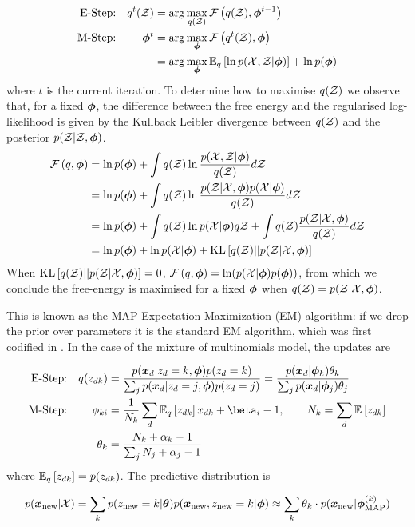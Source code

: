 \begin{align*}
\text{E-Step:} & & q^t(\zdat) & = \arg \max_{q(\zdat)} \fqt{q(\zdat), \param^{t-1}} \\
\text{M-Step:} & & \param^t & = \arg \max_{\param} \fqt{q^t(\zdat), \param} \\
& & & = \arg \max_{\param} \exlogjoint{q} + \ln p(\param)
\end{align*}
where $t$ is the current iteration. To determine how to maximise $q(\zdat)$ we observe that, for a fixed $\param$, the difference between the free energy and the regularised log-likelihood is given by the Kullback Leibler divergence between $q(\zdat)$ and the posterior $p(\zdat|\zdat, \param)$.
\begin{align*}
\fqt{q, \param} 
& = \ln p(\param) + \int q(\zdat) \ln \frac{p(\xdat, \zdat|\param)}{q(\zdat)} d\zdat \\
& = \ln p(\param) + \int q(\zdat) \ln \frac{p(\zdat|\xdat, \param)p(\xdat | \param)}{q(\zdat)} d\zdat \\
& = \ln p(\param) + \int q(\zdat) \ln p(\xdat | \param) q\zdat + \int q(\zdat)\frac{p(\zdat|\xdat, \param)}{q(\zdat)} d\zdat \\
& = \ln p(\param) + \ln p(\xdat | \param) + \kl{q(\zdat)}{p(\zdat|\xdat, \param)}
\end{align*}
When $\kl{q(\zdat)}{p(\zdat|\xdat, \param)} = 0$, $\fqt{q, \param} = \ln(p(\xdat | \param)p(\param))$, from which we conclude the free-energy is maximised for a fixed $\param$ when $q(\zdat) = p(\zdat | \xdat, \param)$.

This is known as the MAP Expectation Maximization (EM) algorithm: if we drop the prior over parameters it is the standard EM algorithm, which was first codified in \cite{Dempster1977}. In the case of the mixture of multinomials model, the updates are

\begin{align*}
\text{E-Step:} & & q(z_{dk}) 
& = \frac{p(\xd|z_d = k, \param)p(z_d = k)}{\sum_j p(\xd|z_d = j, \param)p(z_d = j)} 
= \frac{p(\xd | \param_k) \theta_k}{\sum_j p(\xd | \param_j) \theta_j}  \\
\text{M-Step:} 
& & \phi_{ki} & = \frac{1}{N_k} \sum_d \ex{z_{dk}}{q} x_{dk} + \beta_i - 1, \qquad N_k = \sum_d \ex{z_{dk}}{} \\
& & \theta_k & =  \frac{N_k + \alpha_k - 1}{\sum_j N_j + \alpha_j - 1}
\end{align*}
where $\ex{z_{dk}}{q} = p(z_{dk})$. The predictive distribution is

\begin{align*}
p(\xnew | \xdat)  = \sum_k p(z_{\text{new}} = k | \vv{\theta}) p(\xnew, z_{\text{new}} = k | \param) 
\approx \sum_k \theta_k \cdot p(\xnew | \param^{(k)}_{\text{MAP}})
\end{align*}

